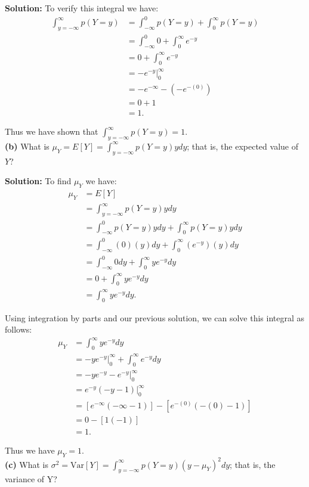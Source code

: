 \documentclass[a4paper]{article}
\begin{document}
\textbf{Solution:} To verify this integral we have:
\begin{align*}
\int_{y=-\infty}^\infty p(Y=y) &= \int_{-\infty}^0 p(Y=y) + \int_{0}^\infty p(Y=y)\\
&= \int_{-\infty}^0 0 + \int_{0}^\infty e^{-y}\\
&= 0 + \int_{0}^\infty e^{-y}\\
&= -e^{-y} \Big|_0^\infty\\
&= -e^{-\infty} - (-e^{-(0)})\\
&= 0 + 1\\
&= 1.
\end{align*}

Thus we have shown that $\int_{y=-\infty}^\infty p(Y=y) = 1$.\\
\textbf{(b)} What is $\mu_Y = E[Y] = \int_{y=-\infty}^\infty p(Y=y) y dy$; that is, the expected 
value of $Y$?

\textbf{Solution:} To find $\mu_Y$ we have:
\begin{align*}
  \mu_Y &= E[Y]\\
  &= \int_{y=-\infty}^\infty p(Y=y) y dy\\
  &= \int_{-\infty}^0 p(Y=y) y dy + \int_{0}^\infty p(Y=y) y dy\\
  &= \int_{-\infty}^0 (0)(y) dy + \int_{0}^\infty (e^{-y}) (y) dy\\
  &= \int_{-\infty}^0 0 dy + \int_{0}^\infty ye^{-y} dy\\
  &= 0 + \int_{0}^\infty ye^{-y} dy\\
  &= \int_{0}^\infty ye^{-y} dy.
\end{align*}

Using integration by parts and our previous solution, we can solve this integral as follows:
\begin{align*}
  \mu_Y &= \int_{0}^\infty ye^{-y} dy\\
  &= -ye^{-y} \Big|_0^\infty + \int_0^\infty e^{-y} dy\\
  &= -ye^{-y} - e^{-y} \Big|_0^\infty\\
  &= e^{-y} (-y-1) \Big|_0^\infty\\
  &= [e^{-\infty} (-\infty-1)] - [e^{-(0)} (-(0)-1)]\\
  &= 0 - [1 (-1)]\\
  &= 1.
\end{align*}

Thus we have $\mu_Y = 1$.\\
\textbf{(c)} What is $\sigma^2 = \text{Var}[Y] = \int_{y=-\infty}^\infty p(Y=y) (y - \mu_Y)^2 dy$;
that is, the variance of Y?
\end{document}
